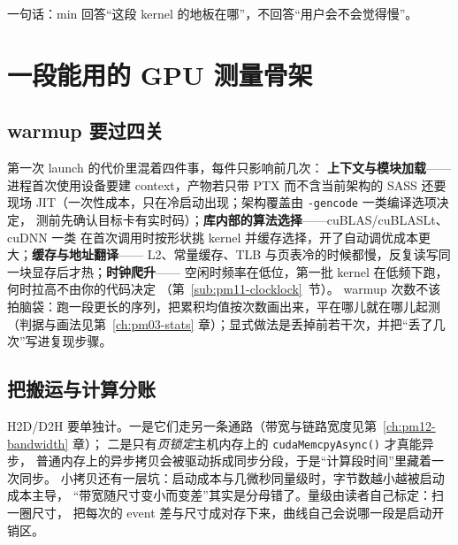 \documentclass[12pt,a4paper,fontset=fandol]{ctexbook}
\newcommand{\Fn}[1]{\texttt{#1()}}
\newcommand{\Tp}[1]{\texttt{#1}}
\newcommand{\Bk}{\discretionary{}{}{}}
\begin{document}
一句话：min 回答``这段 kernel 的地板在哪''，不回答``用户会不会觉得慢''。

\section{一段能用的 GPU 测量骨架}
\label{sec:pm11-skeleton}

\subsection{warmup 要过四关}
\label{sub:pm11-warmup}

第一次 launch 的代价里混着四件事，每件只影响前几次：
\textbf{上下文与模块加载}——进程首次使用设备要建 context，产物若只带 PTX 而不含当前架构的 SASS
还要现场 JIT（一次性成本，只在冷启动出现；架构覆盖由 \Tp{-gencode} 一类编译选项决定，
测前先确认目标卡有实时码）；\textbf{库内部的算法选择}——cuBLAS/cuBLASLt、cuDNN 一类
在首次调用时按形状挑 kernel 并缓存选择，开了自动调优成本更大；\textbf{缓存与地址翻译}——
L2、常量缓存、TLB 与页表冷的时候都慢，反复读写同一块显存后才热；\textbf{时钟爬升}——
空闲时频率在低位，第一批 kernel 在低频下跑，何时拉高不由你的代码决定
（第~\ref{sub:pm11-clocklock}~节）。
warmup 次数不该拍脑袋：跑一段更长的序列，把累积均值按次数画出来，平在哪儿就在哪儿起测
（判据与画法见第~\ref{ch:pm03-stats} 章）；显式做法是丢掉前若干次，并把``丢了几次''写进复现步骤。

\subsection{把搬运与计算分账}
\label{sub:pm11-transfer}

H2D/D2H 要单独计。一是它们走另一条通路（带宽与链路宽度见第~\ref{ch:pm12-bandwidth} 章）；
二是只有\emph{页锁定}主机内存上的 \Fn{cudaMem{\Bk}cpy{\Bk}Async} 才真能异步，
普通内存上的异步拷贝会被驱动拆成同步分段，于是``计算段时间''里藏着一次同步。
小拷贝还有一层坑：启动成本与几微秒同量级时，字节数越小越被启动成本主导，
``带宽随尺寸变小而变差''其实是分母错了。量级由读者自己标定：扫一圈尺寸，
把每次的 event 差与尺寸成对存下来，曲线自己会说哪一段是启动开销区。
\end{document}
